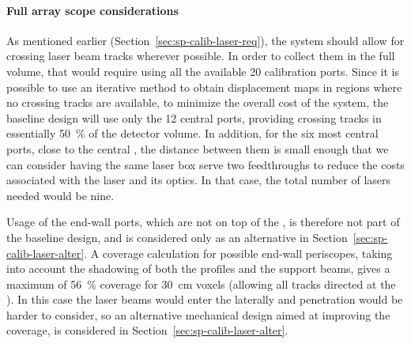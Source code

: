 \paragraph{Full array scope considerations}

As mentioned earlier (Section~\ref{sec:sp-calib-laser-req}), the system should allow for crossing laser beam tracks wherever possible. In order to %
collect them in the full  volume, that would require using all the available \num{20} calibration ports. Since it is possible to use an iterative method to obtain displacement maps in regions where no crossing tracks are available, 
to minimize the overall cost of the system, the baseline design will use only the \num{12} central ports, providing crossing tracks in essentially \SI{50}{\%} of the detector volume. 
In addition, for the six most central ports, close to the central , the distance between them is small enough that we can consider having the same laser box serve two feedthroughs to reduce the costs associated with the laser and its optics. In that case, the total number of lasers needed would be nine.

Usage of the end-wall ports, which are not %
on top of the , is therefore not part of the baseline design, and is considered only as an alternative in Section~\ref{sec:sp-calib-laser-alter}. A coverage calculation for possible end-wall periscopes, taking into account the shadowing of both the  profiles and the support beams, gives a maximum of \SI{56}{\%} coverage for \SI{30}{\cm} voxels (allowing all tracks directed at the ). In this case the laser beams would enter the  laterally and  penetration would be harder to consider, so an alternative mechanical design aimed at improving the coverage, is considered in Section~\ref{sec:sp-calib-laser-alter}.




